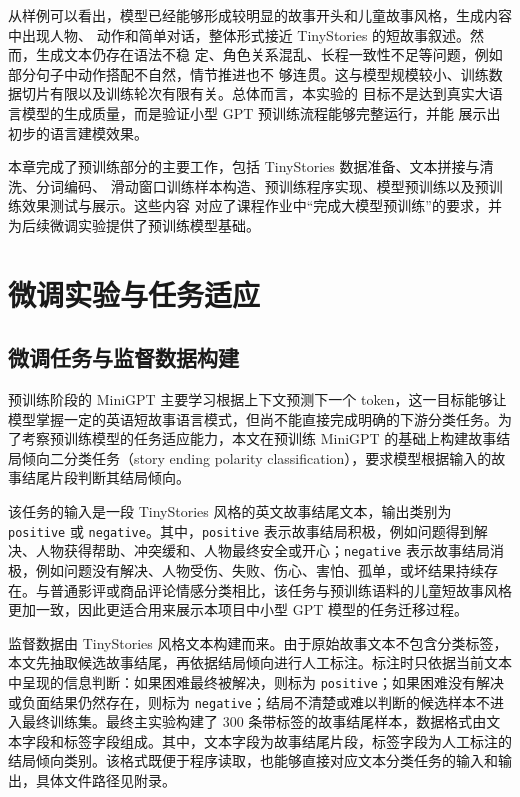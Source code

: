 \documentclass[UTF8,a4paper,zihao=-4,fontset=none]{ctexart}
\numberwithin{equation}{section}
\begin{document}
从样例可以看出，模型已经能够形成较明显的故事开头和儿童故事风格，生成内容中出现人物、
动作和简单对话，整体形式接近 TinyStories 的短故事叙述。然而，生成文本仍存在语法不稳
定、角色关系混乱、长程一致性不足等问题，例如部分句子中动作搭配不自然，情节推进也不
够连贯。这与模型规模较小、训练数据切片有限以及训练轮次有限有关。总体而言，本实验的
目标不是达到真实大语言模型的生成质量，而是验证小型 GPT 预训练流程能够完整运行，并能
展示出初步的语言建模效果。

本章完成了预训练部分的主要工作，包括 TinyStories 数据准备、文本拼接与清洗、分词编码、
滑动窗口训练样本构造、预训练程序实现、模型预训练以及预训练效果测试与展示。这些内容
对应了课程作业中“完成大模型预训练”的要求，并为后续微调实验提供了预训练模型基础。

\section{微调实验与任务适应}

\subsection{微调任务与监督数据构建}

预训练阶段的 MiniGPT 主要学习根据上下文预测下一个 token，这一目标能够让模型掌握一定的英语短故事语言模式，但尚不能直接完成明确的下游分类任务。为了考察预训练模型的任务适应能力，本文在预训练 MiniGPT 的基础上构建故事结局倾向二分类任务（story ending polarity classification），要求模型根据输入的故事结尾片段判断其结局倾向。

该任务的输入是一段 TinyStories 风格的英文故事结尾文本，输出类别为 \texttt{positive} 或 \texttt{negative}。其中，\texttt{positive} 表示故事结局积极，例如问题得到解决、人物获得帮助、冲突缓和、人物最终安全或开心；\texttt{negative} 表示故事结局消极，例如问题没有解决、人物受伤、失败、伤心、害怕、孤单，或坏结果持续存在。与普通影评或商品评论情感分类相比，该任务与预训练语料的儿童短故事风格更加一致，因此更适合用来展示本项目中小型 GPT 模型的任务迁移过程。

监督数据由 TinyStories 风格文本构建而来。由于原始故事文本不包含分类标签，本文先抽取候选故事结尾，再依据结局倾向进行人工标注。标注时只依据当前文本中呈现的信息判断：如果困难最终被解决，则标为 \texttt{positive}；如果困难没有解决或负面结果仍然存在，则标为 \texttt{negative}；结局不清楚或难以判断的候选样本不进入最终训练集。最终主实验构建了 300 条带标签的故事结尾样本，数据格式由文本字段和标签字段组成。其中，文本字段为故事结尾片段，标签字段为人工标注的结局倾向类别。该格式既便于程序读取，也能够直接对应文本分类任务的输入和输出，具体文件路径见附录。
\end{document}
